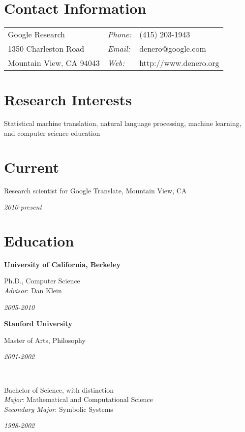 \documentclass[margin,line]{res}
\newcommand{\dated}[2]{\parbox[t]{4.4in}{#1} \hspace{0.4in}
											 \parbox[t]{1in}{ {\it #2 } } }
\begin{document}

\begin{resume}

\section{\sc Contact Information}
\vspace{.05in}
\begin{tabular}{@{}p{2in}lp{4in}}
Google Research            & {\it Phone:} & (415) 203-1943\\
1350 Charleston Road       & {\it Email:} & denero@google.com\\
Mountain View, CA  94043   & {\it Web:}   & http://www.denero.org\\
\end{tabular}

\section{\sc Research Interests}
\dated{Statistical machine translation, natural language processing, machine
learning, and computer science education}{}

\section{\sc Current}
\dated{Research scientist for Google Translate, Mountain View, CA}
{ 2010-present }

\section{\sc Education}
{\bf University of California, Berkeley} \\
\dated{Ph.D., Computer Science \\	
\hspace*{1em} {\it Advisor}: Dan Klein}{ 2005-2010 }

{\bf Stanford University} \\
\dated{Master of Arts, Philosophy\vspace{0.12in}}{ 2001-2002 } \\
\dated{Bachelor of Science, with distinction \\
\hspace*{1em} {\it Major}: Mathematical and Computational Science \\
\hspace*{1em} {\it Secondary Major}: Symbolic Systems}{ 1998-2002 }


\end{resume}
\end{document}
